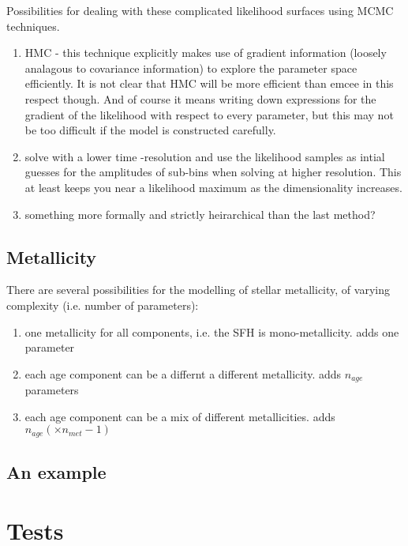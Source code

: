 Possibilities for dealing with these complicated likelihood surfaces using MCMC techniques.  

\begin{enumerate}

\item HMC - this technique explicitly makes use of gradient information (loosely analagous to covariance information) to explore the parameter space efficiently.  It is not clear that HMC will be more efficient than emcee in this respect though.  And of course it means writing down expressions for the gradient of the likelihood with respect to every parameter, but this may not be too difficult if the model is constructed carefully.

\item solve with a lower time -resolution and use the likelihood samples as intial guesses for the amplitudes of sub-bins when solving at higher resolution.  This at least keeps you near a likelihood maximum as the dimensionality increases.

\item something more formally and strictly heirarchical than the last method?

\end{enumerate}

\subsection{Metallicity}
There are several possibilities for the modelling of stellar metallicity, of varying complexity (i.e. number of parameters):
\begin{enumerate}

\item one metallicity for all components, i.e. the SFH is mono-metallicity.  adds one parameter

\item each age component can be a differnt a different metallicity.  adds $n_{age}$ parameters

\item each age component can be a mix of different metallicities.  adds $n_{age} (\times n_{met} -1)$

\end{enumerate}

\subsection{An example}

\section{Tests}

